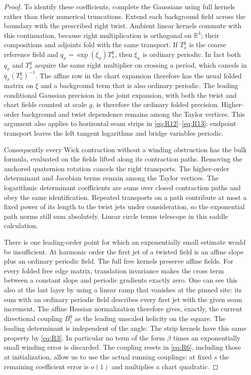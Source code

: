 \begin{proof}
To identify these coefficients, complete the Gaussians using full kernels
rather than their numerical truncations. Extend each background field
across the boundary with the prescribed right twist. Ambient linear
kernels commute with this continuation, because right multiplication is
orthogonal on $\mathbb R^4$; their compositions and adjoints fold with the
same transport. If $T_x^q$ is the coarse reference field and
$q_x=\exp(\xi_x)T_x^q$, then $\xi_x$ is ordinary periodic. In fact both
$q_x$ and $T_x^q$ acquire the same right multiplier on crossing a period,
which cancels in $q_x(T_x^q)^{-1}$. The affine row in the chart expansion
therefore has the usual folded matrix on $\xi$ and a background term that
is also ordinary periodic. The leading conditional Gaussian precision in
the joint expansion, with both the twist and chart fields counted at scale
$g$, is therefore the ordinary folded precision. Higher-order background
and twist dependence remains among the Taylor vertices. This argument also
applies to horizontal seam strips in \eqref{eq:R12}--\eqref{eq:R13}:
endpoint transport leaves
the left tangent logarithms and bridge variables periodic.

Consequently every Wick contraction without a winding obstruction has the
bulk formula, evaluated on the fields lifted along its contraction paths.
Removing the anchored quaternion rotation cancels the right transports.
The higher-order determinant and Jacobian terms remain among the Taylor
vertices. The logarithmic determinant coefficients are sums over closed
contraction paths and obey the same identification. Repeated transports
on a path contribute at most a fixed power of its length to the twist jets
under consideration, so the exponential path norms still sum absolutely.
Linear circle terms telescope in this saddle calculation.

There is one leading-order point for which an exponentially small estimate
would be insufficient. At harmonic order the first jet of a twisted field
is an affine slope plus an ordinary periodic field. The full free kernels
preserve affine fields. For every folded free edge matrix, translation
invariance makes the cross term between a constant slope and periodic
gradients exactly zero. One can see this also at the last layer by using a
linear ramp that vanishes at the pinned site: its sum with an ordinary
periodic field describes every first jet with the given seam increment.
The affine Hessian normalization therefore gives, exactly, the current
directional coupling $B_i^q$ as the leading unscaled helicity on the square.
The leading determinant is independent of the angle. The strip kernels
have this same property by \eqref{eq:R3}. In particular no term of the form
$\beta$ times an exponentially small winding error is discarded. The
coupling resets in \eqref{eq:R6}, including those at initialization, allow
us to use the actual running couplings: at fixed $s$ the remaining
coefficient error is $o(1)$ and multiplies a chart quadratic.


\end{proof}
